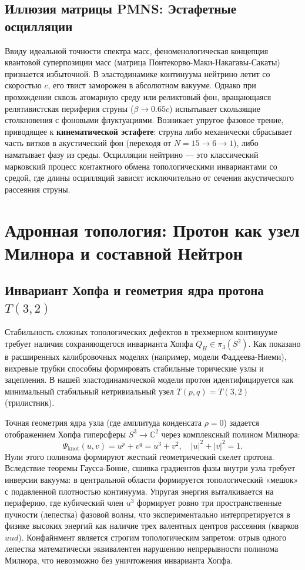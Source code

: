 \documentclass[11pt,a4paper]{article}
\begin{document}
\subsection{Иллюзия матрицы PMNS: Эстафетные осцилляции}
Ввиду идеальной точности спектра масс, феноменологическая концепция квантовой суперпозиции масс (матрица Понтекорво-Маки-Накагавы-Сакаты) признается избыточной. В эластодинамике континуума нейтрино летит со скоростью $c$, его твист заморожен в абсолютном вакууме. 
Однако при прохождении сквозь атомарную среду или реликтовый фон, вращающаяся релятивистская периферия струны ($\beta \to 0.65c$) испытывает скользящие столкновения с фоновыми флуктуациями. Возникает упругое фазовое трение, приводящее к \textbf{кинематической эстафете}: струна либо механически сбрасывает часть витков в акустический фон (переходя от $N=15 \to 6 \to 1$), либо наматывает фазу из среды. 
Осцилляции нейтрино — это классический марковский процесс контактного обмена топологическими инвариантами со средой, где длины осцилляций зависят исключительно от сечения акустического рассеяния струны.

\section{Адронная топология: Протон как узел Милнора и составной Нейтрон}

\subsection{Инвариант Хопфа и геометрия ядра протона $T(3,2)$}
Стабильность сложных топологических дефектов в трехмерном континууме требует наличия сохраняющегося инварианта Хопфа $Q_H \in \pi_3(S^2)$. Как показано в расширенных калибровочных моделях (например, модели Фаддеева-Ниеми), вихревые трубки способны формировать стабильные торические узлы и зацепления.
В нашей эластодинамической модели протон идентифицируется как минимальный стабильный нетривиальный узел $T(p,q) = T(3,2)$ (трилистник). 

Точная геометрия ядра узла (где амплитуда конденсата $\rho = 0$) задается отображением Хопфа гиперсферы $S^3 \to \mathbb{C}^2$ через комплексный полином Милнора:
\begin{equation}
\Psi_{\text{knot}}(u, v) = u^p + v^q = u^3 + v^2, \quad |u|^2 + |v|^2 = 1.
\end{equation}
Нули этого полинома формируют жесткий геометрический скелет протона. Вследствие теоремы Гаусса-Бонне, сшивка градиентов фазы внутри узла требует инверсии вакуума: в центральной области формируется топологический «мешок» с подавленной плотностью континуума. Упругая энергия выталкивается на периферию, где кубический член $u^3$ формирует ровно три пространственные пучности (лепестка) фазовой волны, что экспериментально интерпретируется в физике высоких энергий как наличие трех валентных центров рассеяния (кварков $uud$). Конфайнмент является строгим топологическим запретом: отрыв одного лепестка математически эквивалентен нарушению непрерывности полинома Милнора, что невозможно без уничтожения инварианта Хопфа.
\end{document}
